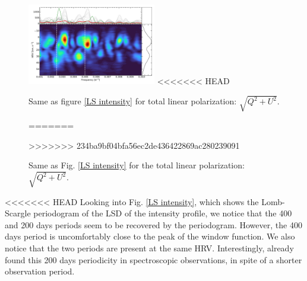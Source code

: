 \documentclass{aa}
\begin{document}
\begin{figure}[!h]
    \centering
    \includegraphics[width=0.5\textwidth]{Lomb-Scargle linear polarization.pdf}
<<<<<<< HEAD
    \caption{Same as figure \ref{LS intensity} for total linear polarization: $\sqrt{Q^2+U^2}$.}
=======
    \caption{Same as Fig. \ref{LS intensity} for the total linear polarization: $\sqrt{Q^2+U^2}$.}
>>>>>>> 234ba9bf04bfa56ec2de436422869ac280239091
    \label{LS linear polarization}
\end{figure}




<<<<<<< HEAD
Looking into Fig. \ref{LS intensity}, which shows the Lomb-Scargle periodogram of the LSD of the intensity profile, 
we notice that the 400 and 200 days periods seem to be recovered by the periodogram. However, the 400 days period is uncomfortably close to 
the peak of the window function. We also notice that the two periods are present at the same HRV. Interestingly, 
\cite{mathias_evolution_2018} already found this 200 days periodicity in spectroscopic observations, in spite of a shorter observation period. 
\end{document}
